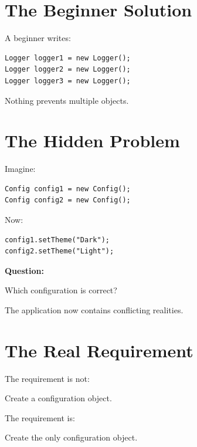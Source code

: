 \documentclass[11pt,a4paper]{book}
\begin{document}

\section{The Beginner Solution}

\begin{trap}

A beginner writes:

\begin{verbatim}
Logger logger1 = new Logger();
Logger logger2 = new Logger();
Logger logger3 = new Logger();
\end{verbatim}

Nothing prevents multiple objects.

\end{trap}


\section{The Hidden Problem}

Imagine:

\begin{verbatim}
Config config1 = new Config();
Config config2 = new Config();
\end{verbatim}

Now:

\begin{verbatim}
config1.setTheme("Dark");
config2.setTheme("Light");
\end{verbatim}

\textbf{Question:}

Which configuration is correct?

The application now contains conflicting realities.


\section{The Real Requirement}

\begin{idea}

The requirement is not:

Create a configuration object.

The requirement is:

Create the only configuration object.

\end{idea}
\end{document}
